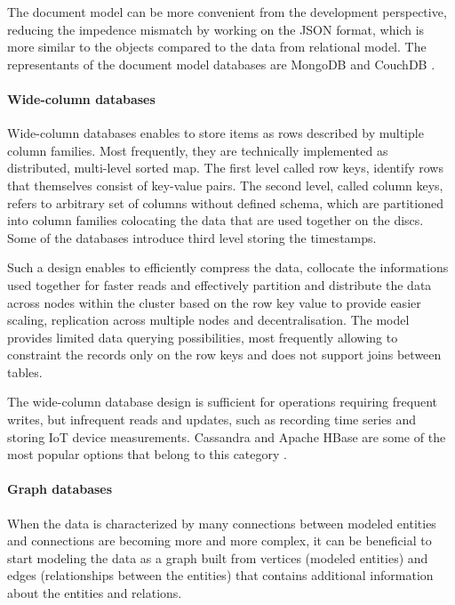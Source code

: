 The document model can be more convenient from the development perspective, reducing the impedence mismatch by working on the JSON format, which is more similar to the objects compared to the data from relational model. The representants of the document model databases are MongoDB and CouchDB \cite{DesignDataIntensiveApplications}.

\paragraph*{Wide-column databases}

Wide-column databases enables to store items as rows described by multiple column families. Most frequently, they are technically implemented as distributed, multi-level sorted map. The first level called row keys, identify rows that themselves consist of key-value pairs. The second level, called column keys, refers to arbitrary set of columns without defined schema, which are partitioned into column families colocating the data that are used together on the discs. Some of the databases introduce third level storing the timestamps. 

Such a design enables to efficiently compress the data, collocate the informations used together for faster reads and effectively partition and distribute the data across nodes within the cluster based on the row key value to provide easier scaling, replication across multiple nodes and decentralisation. The model provides limited data querying possibilities, most frequently allowing to constraint the records only on the row keys and does not support joins between tables.

The wide-column database design is sufficient for operations requiring frequent writes, but infrequent reads and updates, such as recording time series and storing IoT device measurements. Cassandra and Apache HBase are some of the most popular options that belong to this category \cite{NoSQLDatabaseSystemsSurveyDecisionGuidance}.

\paragraph*{Graph databases}

When the data is characterized by many connections between modeled entities and connections are becoming more and more complex, it can be beneficial to start modeling the data as a graph built from vertices (modeled entities) and edges (relationships between the entities) that contains additional information about the entities and relations. 

